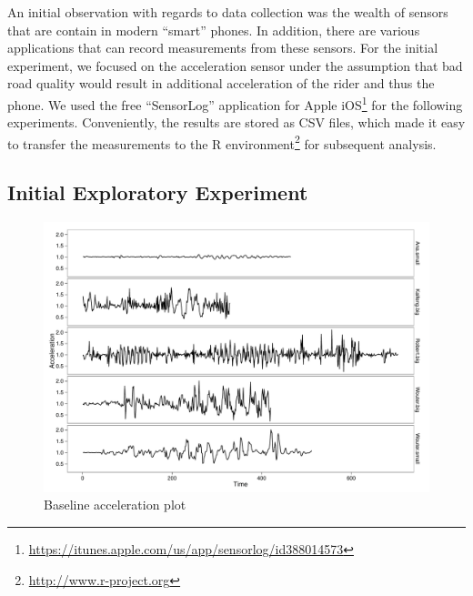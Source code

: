 \documentclass[a4paper,11pt]{article}
\begin{document}
An initial observation with regards to data collection was the wealth of sensors that are contain in modern ``smart'' phones. In addition, there are various applications that can record measurements from these sensors. For the initial experiment, we focused on the acceleration sensor under the assumption that bad road quality would result in additional acceleration of the rider and thus the phone. We used the free ``SensorLog'' application for Apple iOS\footnote{\url{https://itunes.apple.com/us/app/sensorlog/id388014573}} for the following experiments. Conveniently, the results are stored as CSV files, which made it easy to transfer the measurements to the R environment\footnote{\url{http://www.r-project.org}} for subsequent analysis.

\subsection{Initial Exploratory Experiment}

\begin{figure}
\centering
\includegraphics[width=13cm]{figures/accelerationplot}
\caption{Baseline acceleration plot}
\label{fig:accplot}
\end{figure}
\end{document}
